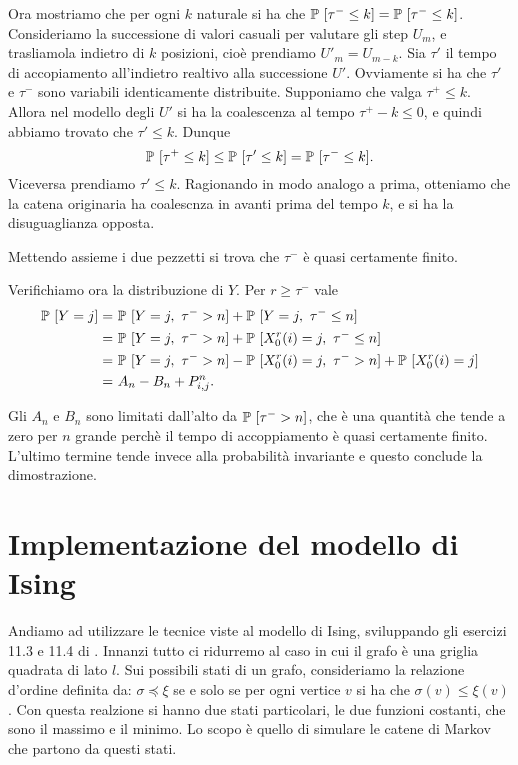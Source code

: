 \documentclass[]{marticle}
\begin{document}
Ora mostriamo che per ogni $k$ naturale si ha che $\mathbb{P}\ [\tau^- \leq k] =
\mathbb{P}\ [\tau^- \leq k]$. Consideriamo la successione di valori casuali per
valutare gli step $U_m$, e trasliamola indietro di $k$ posizioni, cio\`e
prendiamo $U'_m = U_{m-k}$. Sia $\tau'$ il tempo di accopiamento all'indietro
realtivo alla successione $U'$. Ovviamente si ha che $\tau'$ e $\tau^-$ sono
variabili identicamente distribuite. Supponiamo che valga $\tau^+ \leq k$.
Allora nel modello degli $U'$ si ha la coalescenza al tempo $\tau^+ - k  \leq
0$, e quindi abbiamo trovato che $\tau' \leq k$. Dunque
\[
    \mathbb{P}\ [ \tau^+ \leq k] \leq \mathbb{P}\ [ \tau' \leq k] = \mathbb{P}\ [ \tau^- \leq k].
\]
Viceversa prendiamo $\tau' \leq k$. Ragionando in modo analogo a prima,
otteniamo che la catena originaria ha coalescnza in avanti prima del tempo $k$,
e si ha la disuguaglianza opposta.

Mettendo assieme i due pezzetti si trova che $\tau^-$ \`e quasi certamente
finito. 

Verifichiamo ora la distribuzione di $Y$. Per $r \geq \tau^-$ vale
\begin{align*}
    \mathbb{P}\ [Y=j] =&\ \mathbb{P}\ [Y=j,\ \tau^- > n] + \mathbb{P}\ [Y=j,\ \tau^- \leq n] \\
    =&\ \mathbb{P}\ [Y=j,\ \tau^- > n] + \mathbb{P}\ [X_0^r(i)=j,\ \tau^- \leq n] \\
    =&\ \mathbb{P}\ [Y=j,\ \tau^- > n] - \mathbb{P}\ [X_0^r(i)=j,\ \tau^- > n] 
            + \mathbb{P}\ [X_0^r(i)=j] \\
    =&\ A_n - B_n + P^n_{i,j}.
\end{align*}

Gli $A_n$ e $B_n$ sono limitati dall'alto da $\mathbb{P}\ [\tau^- > n]$, che \`e una
quantit\`a che tende a zero per $n$ grande perch\`e il tempo di accoppiamento
\`e quasi certamente finito. L'ultimo termine tende invece alla probabilit\`a
invariante e questo conclude la dimostrazione.


\section{Implementazione del modello di Ising}
Andiamo ad utilizzare le tecnice viste al modello di Ising, sviluppando gli
esercizi 11.3 e 11.4 di \cite{haggstrom}. Innanzi tutto ci ridurremo al caso in
cui il grafo \`e una griglia quadrata di lato $l$. Sui possibili stati di un
grafo, consideriamo la relazione d'ordine definita da: $\sigma \preceq \xi$ se e
solo se per ogni vertice $v$ si ha che $\sigma(v) \leq \xi(v)$.  Con questa
realzione si hanno due stati particolari, le due funzioni costanti, che sono il
massimo e il minimo. Lo scopo \`e quello di simulare le catene di Markov che
partono da questi stati. 
\end{document}
